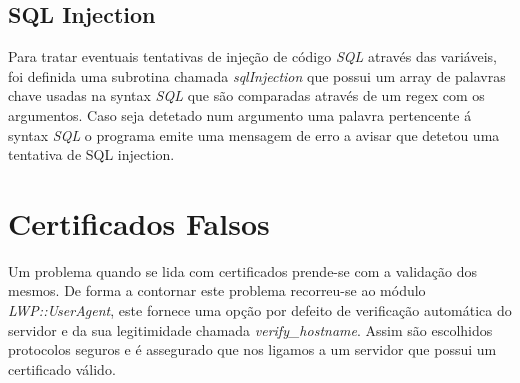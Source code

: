 \subsection{SQL Injection}

Para tratar eventuais tentativas de injeção de código \textit{SQL} através das variáveis, foi definida uma subrotina chamada \textit{sqlInjection} que possui um array de palavras chave usadas na syntax \textit{SQL} que são comparadas através de um regex com os argumentos. Caso seja detetado num argumento uma palavra pertencente á syntax \textit{SQL} o programa emite uma mensagem de erro a avisar que detetou uma tentativa de SQL injection.

\section{Certificados Falsos}

Um problema quando se lida com certificados prende-se com a validação dos mesmos. De forma a contornar este problema recorreu-se ao módulo \textit{LWP::UserAgent}, este fornece uma opção por defeito de verificação automática do servidor e da sua legitimidade chamada \textit{verify\_hostname}. Assim são escolhidos protocolos seguros e é assegurado que nos ligamos a um servidor que possui um certificado válido.
